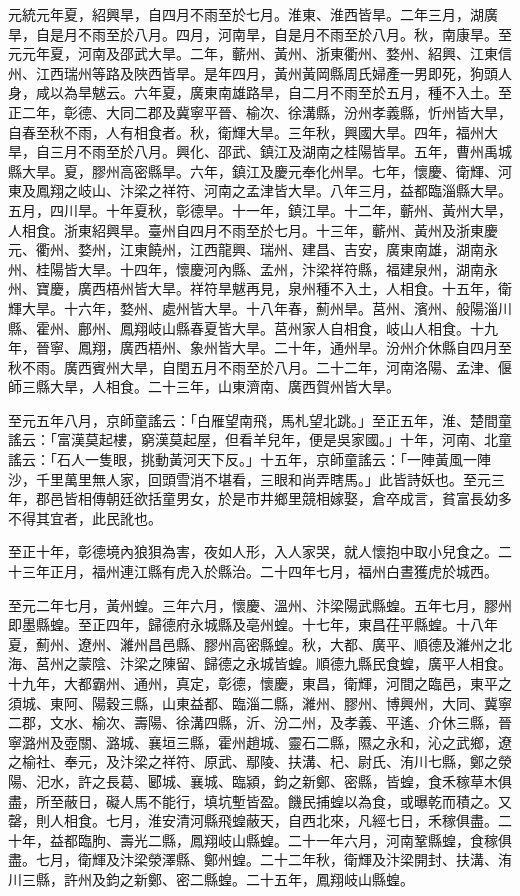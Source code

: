 \begin{pinyinscope}
 元統元年夏，紹興旱，自四月不雨至於七月。淮東、淮西皆旱。二年三月，湖廣旱，自是月不雨至於八月。四月，河南旱，自是月不雨至於八月。秋，南康旱。至元元年夏，河南及邵武大旱。二年，蘄州、黃州、浙東衢州、婺州、紹興、江東信州、江西瑞州等路及陜西皆旱。是年四月，黃州黃岡縣周氏婦產一男即死，狗頭人身，咸以為旱魃云。六年夏，廣東南雄路旱，自二月不雨至於五月，種不入土。至正二年，彰德、大同二郡及冀寧平晉、榆次、徐溝縣，汾州孝義縣，忻州皆大旱，自春至秋不雨，人有相食者。秋，衛輝大旱。三年秋，興國大旱。四年，福州大旱，自三月不雨至於八月。興化、邵武、鎮江及湖南之桂陽皆旱。五年，曹州禹城縣大旱。夏，膠州高密縣旱。六年，鎮江及慶元奉化州旱。七年，懷慶、衛輝、河東及鳳翔之岐山、汴梁之祥符、河南之孟津皆大旱。八年三月，益都臨淄縣大旱。五月，四川旱。十年夏秋，彰德旱。十一年，鎮江旱。十二年，蘄州、黃州大旱，人相食。浙東紹興旱。臺州自四月不雨至於七月。十三年，蘄州、黃州及浙東慶元、衢州、婺州，江東饒州，江西龍興、瑞州、建昌、吉安，廣東南雄，湖南永州、桂陽皆大旱。十四年，懷慶河內縣、孟州，汴梁祥符縣，福建泉州，湖南永州、寶慶，廣西梧州皆大旱。祥符旱魃再見，泉州種不入土，人相食。十五年，衛輝大旱。十六年，婺州、處州皆大旱。十八年春，薊州旱。莒州、濱州、般陽淄川縣、霍州、鄜州、鳳翔岐山縣春夏皆大旱。莒州家人自相食，岐山人相食。十九年，晉寧、鳳翔，廣西梧州、象州皆大旱。二十年，通州旱。汾州介休縣自四月至秋不雨。廣西賓州大旱，自閏五月不雨至於八月。二十二年，河南洛陽、孟津、偃師三縣大旱，人相食。二十三年，山東濟南、廣西賀州皆大旱。



 至元五年八月，京師童謠云：「白雁望南飛，馬札望北跳。」至正五年，淮、楚間童謠云：「富漢莫起樓，窮漢莫起屋，但看羊兒年，便是吳家國。」十年，河南、北童謠云：「石人一隻眼，挑動黃河天下反。」十五年，京師童謠云：「一陣黃風一陣沙，千里萬里無人家，回頭雪消不堪看，三眼和尚弄瞎馬。」此皆詩妖也。至元三年，郡邑皆相傳朝廷欲括童男女，於是市井鄉里競相嫁娶，倉卒成言，貧富長幼多不得其宜者，此民訛也。



 至正十年，彰德境內狼狽為害，夜如人形，入人家哭，就人懷抱中取小兒食之。二十三年正月，福州連江縣有虎入於縣治。二十四年七月，福州白晝獲虎於城西。



 至元二年七月，黃州蝗。三年六月，懷慶、溫州、汴梁陽武縣蝗。五年七月，膠州即墨縣蝗。至正四年，歸德府永城縣及亳州蝗。十七年，東昌茌平縣蝗。十八年夏，薊州、遼州、濰州昌邑縣、膠州高密縣蝗。秋，大都、廣平、順德及濰州之北海、莒州之蒙陰、汴梁之陳留、歸德之永城皆蝗。順德九縣民食蝗，廣平人相食。十九年，大都霸州、通州，真定，彰德，懷慶，東昌，衛輝，河間之臨邑，東平之須城、東阿、陽穀三縣，山東益都、臨淄二縣，濰州、膠州、博興州，大同、冀寧二郡，文水、榆次、壽陽、徐溝四縣，沂、汾二州，及孝義、平遙、介休三縣，晉寧潞州及壺關、潞城、襄垣三縣，霍州趙城、靈石二縣，隰之永和，沁之武鄉，遼之榆社、奉元，及汴梁之祥符、原武、鄢陵、扶溝、杞、尉氏、洧川七縣，鄭之滎陽、汜水，許之長葛、郾城、襄城、臨潁，鈞之新鄭、密縣，皆蝗，食禾稼草木俱盡，所至蔽日，礙人馬不能行，填坑塹皆盈。饑民捕蝗以為食，或曝乾而積之。又罄，則人相食。七月，淮安清河縣飛蝗蔽天，自西北來，凡經七日，禾稼俱盡。二十年，益都臨朐、壽光二縣，鳳翔岐山縣蝗。二十一年六月，河南鞏縣蝗，食稼俱盡。七月，衛輝及汴梁滎澤縣、鄭州蝗。二十二年秋，衛輝及汴梁開封、扶溝、洧川三縣，許州及鈞之新鄭、密二縣蝗。二十五年，鳳翔岐山縣蝗。




\end{pinyinscope}
